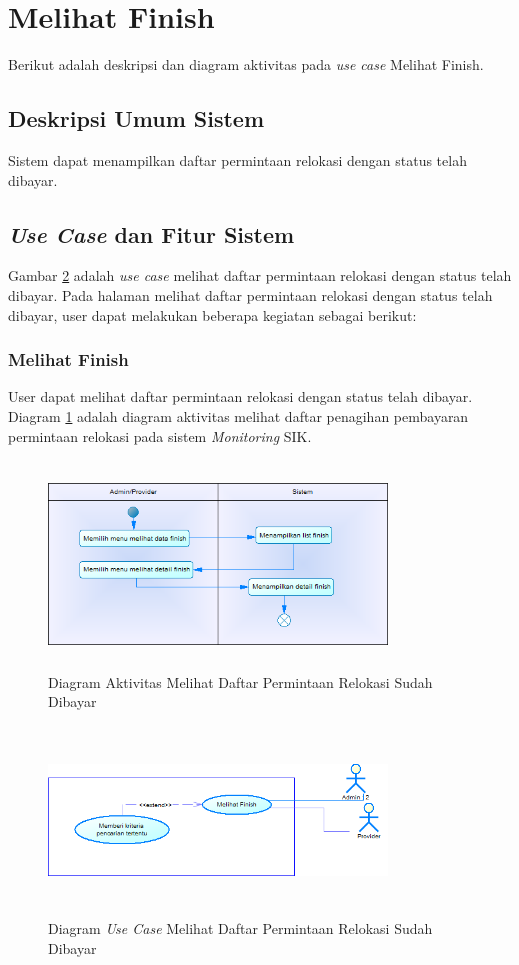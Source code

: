 \section{Melihat Finish}
Berikut adalah deskripsi dan diagram aktivitas pada \textit{use case} Melihat Finish.
\subsection{Deskripsi Umum Sistem}
\tab Sistem dapat menampilkan daftar permintaan relokasi dengan status telah dibayar.
\subsection{\textit{Use Case} dan Fitur Sistem}
Gambar \ref{figure:use_case_melihat_finish} adalah \textit{use case} melihat daftar permintaan relokasi dengan status telah dibayar. Pada halaman melihat daftar permintaan relokasi dengan status telah dibayar, user dapat melakukan beberapa kegiatan sebagai berikut:
	\subsubsection{Melihat Finish}
	User dapat melihat daftar permintaan relokasi dengan status telah dibayar. Diagram \ref{figure:activity_melihat_finish} adalah diagram aktivitas melihat daftar penagihan pembayaran permintaan relokasi pada sistem \textit{Monitoring} SIK.
	\begin{figure}[h]
	\centerline {\includegraphics[width=9cm,height=5.5cm]{bab4/ActivityDiagram_MelihatFinish.png}}
	\caption{Diagram Aktivitas Melihat Daftar Permintaan Relokasi Sudah Dibayar}
	\label{figure:activity_melihat_finish}
	\end{figure}

	\begin{figure}[h!]
	\centerline
	{\includegraphics[width=9cm,height=5cm]{bab4/use-case-melihat-finish.png}}
	\caption{Diagram \textit{Use Case} Melihat Daftar Permintaan Relokasi Sudah Dibayar}
	\label{figure:use_case_melihat_finish}
	\end{figure}
	
